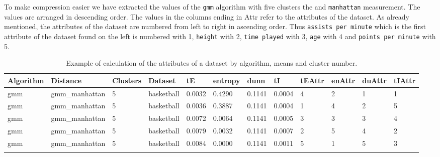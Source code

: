 \documentclass[
]{article}
\begin{document}
To make compression easier we have extracted the values of the
\texttt{gmm} algorithm with five clusters the and \texttt{manhattan}
measurement. The values are arranged in descending order. The values in
the columns ending in Attr refer to the attributes of the dataset. As
already mentioned, the attributes of the dataset are numbered from left
to right in ascending order. Thus \texttt{assists per minute} which is
the first attribute of the dataset found on the left is numbered with 1,
\texttt{height} with 2, \texttt{time played} with 3, \texttt{age} with 4
and \texttt{points per minute} with 5.

\begin{longtable}{| p{1.1cm} | p{2cm} | p{0.8cm} | p{1.3cm} | p{0.60cm} | p{0.7cm} | p{0.65cm} | p{0.65cm} | p{0.65cm} | p{0.65cm} | p{0.7cm} | p{0.65cm} |}
\hline
\scriptsize  Algorithm & \scriptsize  Distance  &  \scriptsize Clusters & \scriptsize  Dataset & \scriptsize tE & \scriptsize entropy & \scriptsize  dunn  & \scriptsize tI & \scriptsize tEAttr & \scriptsize enAttr & \scriptsize duAttr & \scriptsize tIAttr  \\
\hline
\scriptsize     gmm   & \scriptsize    gmm\_manhattan & \scriptsize    5    & \scriptsize basketball & \scriptsize    0.0032  &  \scriptsize 0.4290 & \scriptsize 0.1141 & \scriptsize    0.0004 & \scriptsize   4  & \scriptsize    2  & \scriptsize    1  & \scriptsize    1 \\
\scriptsize     gmm   & \scriptsize    gmm\_manhattan & \scriptsize    5    & \scriptsize basketball & \scriptsize    0.0036  &  \scriptsize 0.3887 & \scriptsize 0.1141 & \scriptsize    0.0004 & \scriptsize   1  & \scriptsize    4  & \scriptsize    2  & \scriptsize    5 \\
\scriptsize     gmm   & \scriptsize    gmm\_manhattan & \scriptsize    5    & \scriptsize basketball & \scriptsize    0.0072  &  \scriptsize 0.0064 & \scriptsize 0.1141 & \scriptsize    0.0005 & \scriptsize   3  & \scriptsize    3  & \scriptsize    3  & \scriptsize    4 \\
\scriptsize     gmm   & \scriptsize    gmm\_manhattan & \scriptsize    5    & \scriptsize basketball & \scriptsize    0.0079  &  \scriptsize 0.0032 & \scriptsize 0.1141 & \scriptsize    0.0007 & \scriptsize   2  & \scriptsize    5  & \scriptsize    4  & \scriptsize    2 \\
\scriptsize     gmm   & \scriptsize    gmm\_manhattan & \scriptsize    5    & \scriptsize basketball & \scriptsize    0.0084  &  \scriptsize 0.0000 & \scriptsize 0.1141 & \scriptsize    0.0011 & \scriptsize   5  & \scriptsize    1  & \scriptsize    5  & \scriptsize    3 \\
\hline
\caption{Example of calculation of the attributes of a dataset by algorithm, means and cluster number.}
\label{tab:clusteringExample}
\end{longtable}
\end{document}
